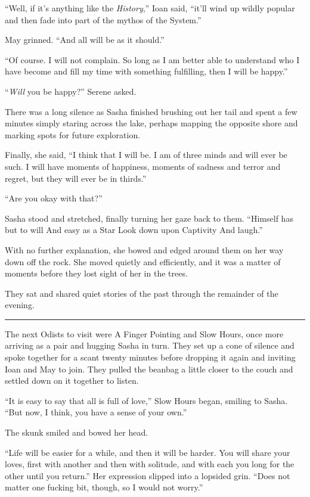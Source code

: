 ``Well, if it's anything like the \emph{History},'' Ioan said, ``it'll wind up wildly popular and then fade into part of the mythos of the System.''

May grinned. ``And all will be as it should.''

``Of course. I will not complain. So long as I am better able to understand who I have become and fill my time with something fulfilling, then I will be happy.''

``\emph{Will} you be happy?'' Serene asked.

There was a long silence as Sasha finished brushing out her tail and spent a few minutes simply staring across the lake, perhaps mapping the opposite shore and marking spots for future exploration.

Finally, she said, ``I think that I will be. I am of three minds and will ever be such. I will have moments of happiness, moments of sadness and terror and regret, but they will ever be in thirds.''

``Are you okay with that?''

Sasha stood and stretched, finally turning her gaze back to them. ``Himself has but to will And easy as a Star Look down upon Captivity And laugh.''

With no further explanation, she bowed and edged around them on her way down off the rock. She moved quietly and efficiently, and it was a matter of moments before they lost sight of her in the trees.

They sat and shared quiet stories of the past through the remainder of the evening.

\begin{center}\rule{0.5\linewidth}{0.5pt}\end{center}

The next Odists to visit were A Finger Pointing and Slow Hours, once more arriving as a pair and hugging Sasha in turn. They set up a cone of silence and spoke together for a scant twenty minutes before dropping it again and inviting Ioan and May to join. They pulled the beanbag a little closer to the couch and settled down on it together to listen.

``It is easy to say that all is full of love,'' Slow Hours began, smiling to Sasha. ``But now, I think, you have a sense of your own.''

The skunk smiled and bowed her head.

``Life will be easier for a while, and then it will be harder. You will share your loves, first with another and then with solitude, and with each you long for the other until you return.'' Her expression slipped into a lopsided grin. ``Does not matter one fucking bit, though, so I would not worry.''

